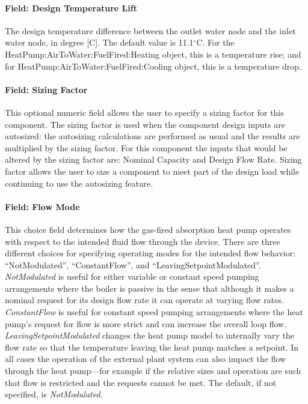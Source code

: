 \paragraph{Field: Design Temperature Lift}

The design temperature difference between the outlet water node and the inlet water node, in degree [C]. The default value is 11.1$^\circ$C. For the HeatPump:AirToWater:FuelFired:Heating object, this is a temperature rise; and for HeatPump:AirToWater:FuelFired:Cooling object, this is a temperature drop.

\paragraph{Field: Sizing Factor}

This optional numeric field allows the user to specify a sizing factor for this component. The sizing factor is used when the component design inputs are autosized: the autosizing calculations are performed as usual and the results are multiplied by the sizing factor. For this component the inputs that would be altered by the sizing factor are: Nominal Capacity and Design Flow Rate. Sizing factor allows the user to size a component to meet part of the design load while continuing to use the autosizing feature.

\paragraph{Field: Flow Mode}

This choice field determines how the gas-fired absorption heat pump operates with respect to the intended fluid flow through the device. There are three different choices for specifying operating modes for the intended flow behavior: ``NotModulated'', ``ConstantFlow'', and ``LeavingSetpointModulated''. \emph{NotModulated} is useful for either variable or constant speed pumping arrangements where the boiler is passive in the sense that although it makes a nominal request for its design flow rate it can operate at varying flow rates. \emph{ConstantFlow} is useful for constant speed pumping arrangements where the heat pump's request for flow is more strict and can increase the overall loop flow. \emph{LeavingSetpointModulated} changes the heat pump model to internally vary the flow rate so that the temperature leaving the heat pump matches a setpoint. In all cases the operation of the external plant system can also impact the flow through the heat pump---for example if the relative sizes and operation are such that flow is restricted and the requests cannot be met. The default, if not specified, is \emph{NotModulated}.

